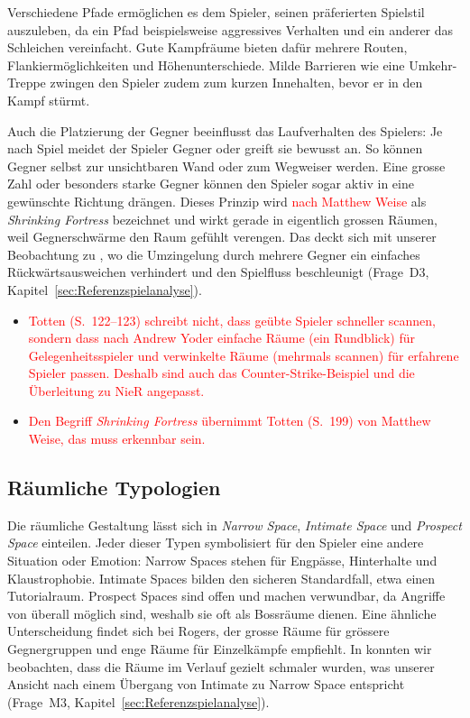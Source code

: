 \documentclass[../Main.tex]{subfiles}
\begin{document}
Verschiedene Pfade ermöglichen es dem Spieler, seinen präferierten Spielstil auszuleben, da ein Pfad beispielsweise aggressives Verhalten und ein anderer das Schleichen vereinfacht.\autocite{gdc_tenprinciples2010} Gute Kampfräume bieten dafür mehrere Routen, Flankiermöglichkeiten und Höhenunterschiede. Milde Barrieren wie eine Umkehr-Treppe zwingen den Spieler zudem zum kurzen Innehalten, bevor er in den Kampf stürmt.\autocite{gdc_horizonquests2018}

Auch die Platzierung der Gegner beeinflusst das Laufverhalten des Spielers: Je nach Spiel meidet der Spieler Gegner oder greift sie bewusst an. So können Gegner selbst zur unsichtbaren Wand oder zum Wegweiser werden.\autocite[199]{totten2014architectural} Eine grosse Zahl oder besonders starke Gegner können den Spieler sogar aktiv in eine gewünschte Richtung drängen. Dieses Prinzip wird \textcolor{red}{nach Matthew Weise} als \textit{Shrinking Fortress} bezeichnet und wirkt gerade in eigentlich grossen Räumen, weil Gegnerschwärme den Raum gefühlt verengen.\autocite[199--200]{totten2014architectural} Das deckt sich mit unserer Beobachtung zu , wo die Umzingelung durch mehrere Gegner ein einfaches Rückwärtsausweichen verhindert und den Spielfluss beschleunigt (Frage~D3, Kapitel~\ref{sec:Referenzspielanalyse}).

\begin{itemize}[leftmargin=1.5cm]
    \item \textcolor{red}{Totten (S.~122--123) schreibt nicht, dass geübte Spieler schneller scannen, sondern dass nach Andrew Yoder einfache Räume (ein Rundblick) für Gelegenheitsspieler und verwinkelte Räume (mehrmals scannen) für erfahrene Spieler passen. Deshalb sind auch das Counter-Strike-Beispiel und die Überleitung zu NieR angepasst.}
    \item \textcolor{red}{Den Begriff \textit{Shrinking Fortress} übernimmt Totten (S.~199) von Matthew Weise, das muss erkennbar sein.}
\end{itemize}

\subsection{Räumliche Typologien} \label{sec:Raumtypologien}
Die räumliche Gestaltung lässt sich in \textit{Narrow Space}, \textit{Intimate Space} und \textit{Prospect Space} einteilen. Jeder dieser Typen symbolisiert für den Spieler eine andere Situation oder Emotion: Narrow Spaces stehen für Engpässe, Hinterhalte und Klaustrophobie. Intimate Spaces bilden den sicheren Standardfall, etwa einen Tutorialraum. Prospect Spaces sind offen und machen verwundbar, da Angriffe von überall möglich sind, weshalb sie oft als Bossräume dienen.\autocite[161--168]{totten2014architectural} Eine ähnliche Unterscheidung findet sich bei Rogers, der grosse Räume für grössere Gegnergruppen und enge Räume für Einzelkämpfe empfiehlt.\autocite[245]{rogers2014levelup} In  konnten wir beobachten, dass die Räume im Verlauf gezielt schmaler wurden, was unserer Ansicht nach einem Übergang von Intimate zu Narrow Space entspricht (Frage~M3, Kapitel~\ref{sec:Referenzspielanalyse}).
\end{document}
